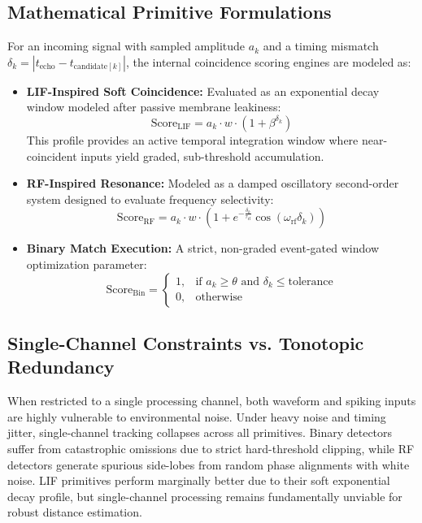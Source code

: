 \subsection{Mathematical Primitive Formulations}

For an incoming signal with sampled amplitude $a_k$ and a timing mismatch $\delta_k = |t_{\text{echo}} - t_{\text{candidate}[k]}|$, the internal coincidence scoring engines are modeled as:

\begin{itemize}
    \item \textbf{LIF-Inspired Soft Coincidence:} Evaluated as an exponential decay window modeled after passive membrane leakiness:
    \begin{equation}
        \text{Score}_{\text{LIF}} = a_k \cdot w \cdot (1 + \beta^{\delta_k})
    \end{equation}
    This profile provides an active temporal integration window where near-coincident inputs yield graded, sub-threshold accumulation.
    
    \item \textbf{RF-Inspired Resonance:} Modeled as a damped oscillatory second-order system designed to evaluate frequency selectivity:
    \begin{equation}
        \text{Score}_{\text{RF}} = a_k \cdot w \cdot \left(1 + e^{-\frac{\delta_k}{\tau_{\text{rf}}}} \cos(\omega_{\text{rf}} \delta_k)\right)
    \end{equation}
    
    \item \textbf{Binary Match Execution:} A strict, non-graded event-gated window optimization parameter:
    \begin{equation}
        \text{Score}_{\text{Bin}} = 
        \begin{cases} 
            1, & \text{if } a_k \geq \theta \text{ and } \delta_k \leq \text{tolerance} \\ 
            0, & \text{otherwise}
        \end{cases}
    \end{equation}
\end{itemize}

\subsection{Single-Channel Constraints vs. Tonotopic Redundancy}

When restricted to a single processing channel, both waveform and spiking inputs are highly vulnerable to environmental noise. Under heavy noise and timing jitter, single-channel tracking collapses across all primitives. Binary detectors suffer from catastrophic omissions due to strict hard-threshold clipping, while RF detectors generate spurious side-lobes from random phase alignments with white noise. LIF primitives perform marginally better due to their soft exponential decay profile, but single-channel processing remains fundamentally unviable for robust distance estimation.

